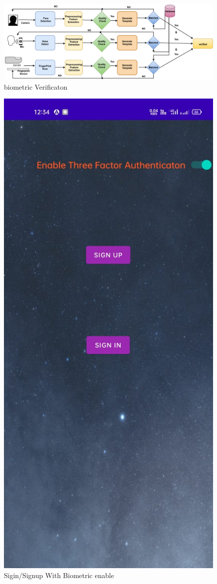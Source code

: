 \documentclass[conference]{IEEEtran}
\begin{document}
\begin{figure}[htbp]
	\centerline{\includegraphics[width=1.0\columnwidth]{biometric.png}}
	\caption{biometric Verificaton }
	\label{fig}
\end{figure}


\begin{figure}[htbp]
	\centerline{\includegraphics[width=0.4\columnwidth]{signupbiometric.jpeg}}
	\caption{Sigin/Signup With Biometric enable }
	\label{fig}
\end{figure}
\end{document}
